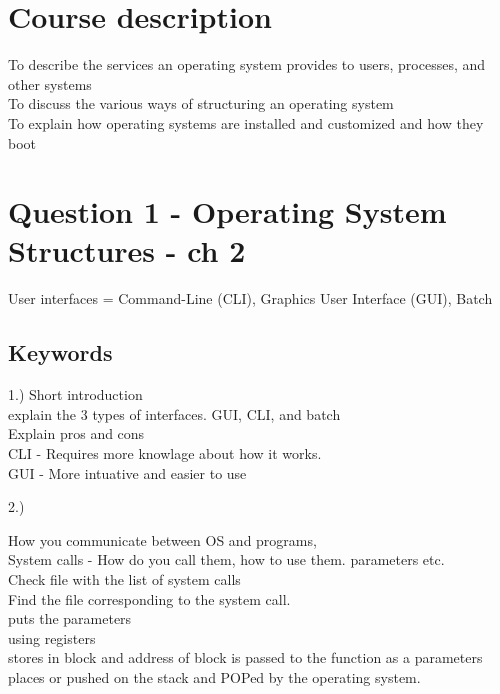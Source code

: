 \documentclass[a4paper,10pt,titlepage]{report}
\date{}
\begin{document}
\renewcommand{\thepage}{\roman{page}}%
\tableofcontents
\newpage
\setcounter{page}{1}
\renewcommand{\thepage}{\arabic{page}}
\section{Course description}
To describe the services an operating system provides to
users, processes, and other systems\\
To discuss the various ways of structuring an operating
system\\
To explain how operating systems are installed and
customized and how they boot\\
\newpage
\section{Question 1 - Operating System Structures - ch 2}
User interfaces = Command-Line (CLI), Graphics User Interface (GUI), Batch \\


\subsection{Keywords}
1.) Short introduction \\
\hspace{10mm}explain the 3 types of interfaces. GUI, CLI, and batch\\
\hspace{15mm}Explain pros and cons\\
\hspace{20mm}CLI - Requires more knowlage about how it works. \\
\hspace{20mm}GUI - More intuative and easier to use \\
\vspace{5mm}


2.)

How you communicate between OS and programs,\\
\hspace{10mm}System calls - How do you call them, how to use them. parameters etc. \\
\hspace{15mm} Check file with the list of system calls \\
\hspace{15mm} Find the file corresponding to the system call.\\
\hspace{15mm} puts the parameters\\
\hspace{20mm} using registers\\
\hspace{20mm} stores in block and address of block is passed to the function as a parameters\\
\hspace{20mm} places or pushed on the stack and POPed by the operating system.\\
\vspace{5mm}
\end{document}
